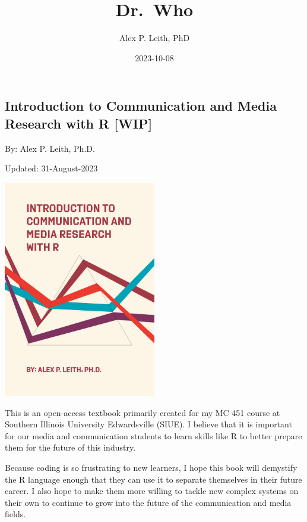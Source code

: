 \documentclass[
  b5paper]{book}
\title{Dr.~Who}
\author{Alex P. Leith, PhD}
\date{2023-10-08}
\begin{document}
\maketitle

{
\setcounter{tocdepth}{1}
\tableofcontents
}
\hypertarget{section}{%
\chapter*{}\label{section}}

\hypertarget{introduction-to-communication-and-media-research-with-r-wip}{%
\section*{Introduction to Communication and Media Research with R {[}WIP{]}}\label{introduction-to-communication-and-media-research-with-r-wip}}

By: Alex P. Leith, Ph.D.

Updated: 31-August-2023

\href{Current\%20Book\%20Cover\%20(Art\%20created\%20with\%20R\textquotesingle{}s\%20aRtsy\%20package)}{\includegraphics[width=0.5\textwidth,height=\textheight]{cover_2.png}}

This is an open-access textbook primarily created for my MC 451 course at Southern Illinois University Edwardsville (SIUE). I believe that it is important for our media and communication students to learn skills like R to better prepare them for the future of this industry.

Because coding is so frustrating to new learners, I hope this book will demystify the R language enough that they can use it to separate themselves in their future career. I also hope to make them more willing to tackle new complex systems on their own to continue to grow into the future of the communication and media fields.
\end{document}
